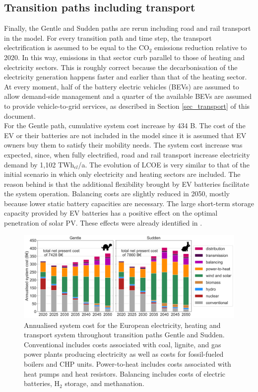 \documentclass[3p]{elsarticle} %
\begin{document}
\subsection{Transition paths including transport}
Finally, the Gentle and Sudden paths are rerun including road and rail transport in the model. For every transition path and time step, the transport electrification is assumed to be equal to the CO$_2$ emissions reduction relative to 2020. In this way, emissions in that sector curb parallel to those of heating and electricity sectors. This is roughly correct because the decarbonisation of the electricity generation happens faster and earlier than that of the heating sector.  
At every moment, half of the battery electric vehicles (BEVs) are assumed to allow demand-side management and a quarter of the available BEVs are assumed to provide vehicle-to-grid services, as described in Section \ref{sec_transport} of this document.\\

For the Gentle path, cumulative system cost increase by 434 B\EUR . The cost of the EV or their batteries are not included in the model since it is assumed that EV owners buy them to satisfy their mobility needs. The system cost increase was expected, since, when fully electrified, road and rail transport increase electricity demand by 1,102 TWh$_{el}$/a. The evolution of LCOE is very similar to that of the initial scenario in which only electricity and heating sectors are included. The reason behind is that the additional flexibility brought by EV batteries facilitate the system operation. Balancing costs are slightly reduced in 2050, mostly because lower static battery capacities are necessary. The large short-term storage capacity provided by EV batteries has a positive effect on the optimal penetration of solar PV. These effects were already identified in \cite{Brown_2018, Victoria_2019_storage}.

\begin{figure}[!h]
	\centering
	\includegraphics[width=\columnwidth]{figures/System_cost_w_EV_exp.png}
	\caption{Annualised system cost for the European electricity, heating and transport system throughout transition paths Gentle and Sudden. Conventional includes costs associated with coal, lignite, and gas power plants producing electricity as well as costs for fossil-fueled boilers and CHP units. Power-to-heat includes costs associated with heat pumps and heat resistors. Balancing includes costs of electric batteries, H$_2$ storage, and methanation.} 
\end{figure}
\end{document}
